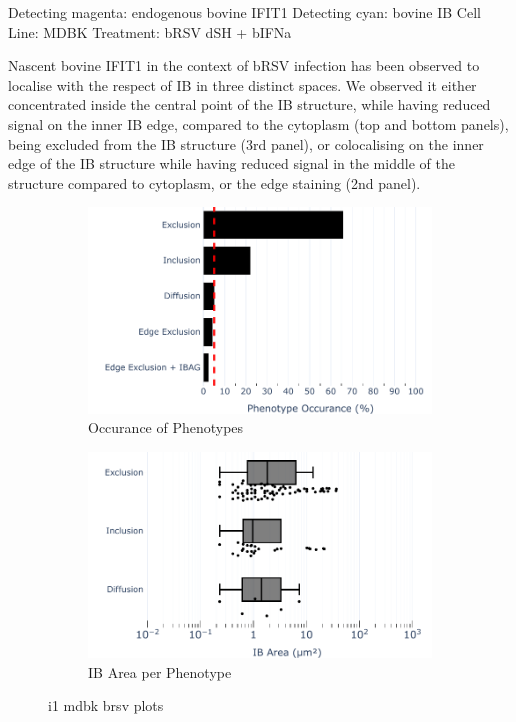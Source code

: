 
Detecting magenta: endogenous bovine IFIT1 \newline
Detecting cyan: bovine IB \newline
Cell Line: MDBK \newline
Treatment: bRSV dSH + bIFNa \newline

Nascent bovine IFIT1 in the context of bRSV infection has been observed to localise with the respect of IB in three distinct spaces. We observed it either concentrated inside the central point of the IB structure, while having reduced signal on the inner IB edge, compared to the cytoplasm (top and bottom panels), being excluded from the IB structure (3rd panel), or colocalising on the inner edge of the IB structure while having reduced signal in the middle of the structure compared to cytoplasm, or the edge staining (2nd panel).

\begin{figure}
    \begin{subfigure}{0.5\textwidth}
        \includegraphics[width=1\linewidth]{09. Chapter 4/Figs/02. Infection/01. IFIT1/07. bar_i1_mdbk.pdf} 
        \caption[]{Occurance of Phenotypes}
    \end{subfigure}
    \begin{subfigure}{0.5\textwidth}
        \includegraphics[width=1\linewidth]{09. Chapter 4/Figs/02. Infection/01. IFIT1/08. box_i1_mdbk.pdf}
        \caption[]{IB Area per Phenotype}
    \end{subfigure}
    \caption[i1 mdbk brsv plots]{i1 mdbk brsv plots}
    \label{fig:i1 mdbk brsv plots}
\end{figure}

